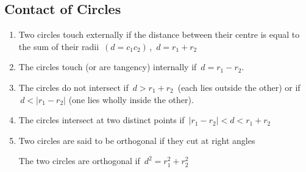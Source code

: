 \documentclass[11pt,a4paper]{article}
\theoremstyle{definition}
\begin{document}
\subsection{Contact of Circles}
\begin{enumerate}
\item Two circles touch externally if the distance between their centre is equal to the sum of their radii $\,(d = c_1c_2)\,$, $\, d = r_1 + r_2$

\item The circles touch (or are tangency) internally if $\, d = r_1 - r_2$.

\item The circles do not intersect if $\, d> r_1 + r_2\,$
(each lies outside the other) or if $\, d< \left|r_1 - r_2\right|$
(one lies wholly inside the other).

\item The circles intersect at two distinct points if
$\,\left|r_1 - r_2\right| < d < r_1 + r_2$

\item Two circles are said to be orthogonal if they cut at right angles\\

\begin{figure}[H]
\centering
{}
\end{figure}















The two circles are orthogonal if $\,d^2 = r_1^2 + r_2^2$\\\
\end{enumerate}
\end{document}
